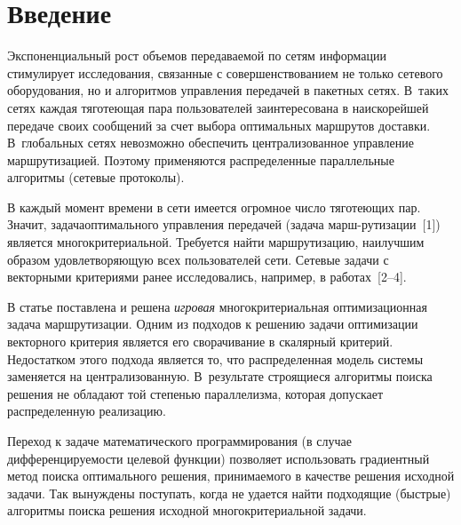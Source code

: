   
  


      \thispagestyle{headings}

      \begin{multicols}{2}

            \label{st\stat}


  \section{Введение}
   
  Экспоненциальный рост объемов передаваемой по сетям информации 
стимулирует исследования, связанные с совершенствованием не только сетевого 
оборудования, но и алгоритмов управления передачей в пакетных сетях. В~таких 
сетях каждая тяготеющая пара пользователей заинтересована в наискорейшей 
передаче своих сообщений за счет выбора оптимальных маршрутов доставки. 
В~глобальных сетях невозможно обеспечить централизованное управление 
маршрутизацией. Поэтому применяются распределенные параллельные алгоритмы 
(сетевые протоколы). 
  
  В каждый момент времени в сети имеется огромное число тяготеющих пар. 
Значит, задача\linebreak оп\-тимального управ\-ле\-ния передачей (задача марш-\linebreak рутизации~[1]) 
является многокритериальной. Требуется найти маршрутизацию, наилучшим 
образом удовле\-тво\-ря\-ющую всех пользователей сети. Сетевые задачи с векторными 
критериями ранее исследовались, например, в работах~[2--4]. 
  
  В статье поставлена и решена \textit{игровая} многокритериальная 
оптимизационная задача маршрутизации. Одним из подходов к решению задачи 
оптимизации векторного критерия является его сворачивание в скалярный 
критерий. Недостатком этого подхода является то, что распределенная модель 
системы заменяется на централизованную. В~результате строящиеся 
алгоритмы поиска решения не обладают той степенью параллелизма, которая 
допускает распределенную реализацию. 
  
  Переход к задаче математического программирования (в случае 
дифференцируемости целевой функции) позволяет использовать градиентный 
метод поиска оптимального решения, принимаемого в качестве решения исходной 
задачи. Так вы\-нуж\-де\-ны поступать, когда не удается найти подходящие (быстрые) 
алгоритмы поиска решения исходной многокритериальной задачи. 


\end{multicols}
